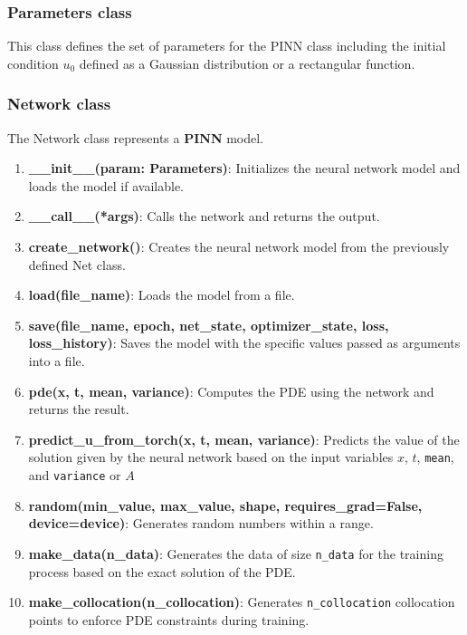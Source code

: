\documentclass{article}
\begin{document}
\subsubsection{Parameters class} This class defines the set of parameters for the PINN class including the initial condition $u_0$ defined as a Gaussian distribution or a rectangular function.
\subsubsection{Network class} The Network class represents a \textbf{PINN} model.
\begin{enumerate}
    \item \textbf{\_\_init\_\_(param: Parameters)}: Initializes the neural network model and loads the model if available.

    \item \textbf{\_\_call\_\_(*args)}: Calls the network and returns the output.
    
    \item \textbf{create\_network()}: Creates the neural network model from the previously defined Net class.
    
    \item \textbf{load(file\_name)}: Loads the model from a file. 
    
    \item \textbf{save(file\_name, epoch, net\_state, optimizer\_state, loss, loss\_history)}: Saves the model with the specific values passed as arguments into a file.
    
    \item \textbf{pde(x, t, mean, variance)}: Computes the PDE using the network and returns the result.
    
    \item \textbf{predict\_u\_from\_torch(x, t, mean, variance)}: Predicts the value of the solution given by the neural network based on the input variables $x$, $t$, \texttt{mean}, and \texttt{variance} or $A$
    
    \item \textbf{random(min\_value, max\_value, shape, requires\_grad=False, device=device)}: Generates random numbers within a range.
    
    \item \textbf{make\_data(n\_data)}: Generates the data of size \texttt{n\_data} for the training process based on the exact solution of the PDE.
    
    \item \textbf{make\_collocation(n\_collocation)}: Generates \texttt{n\_collocation} collocation points to enforce PDE constraints during training.
    

\end{enumerate}
\end{document}
